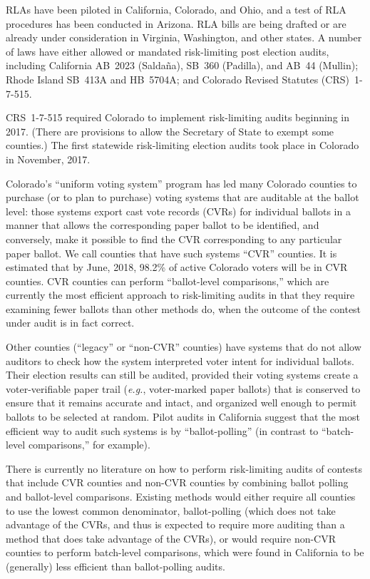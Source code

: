 \documentclass[12pt]{article}
\begin{document}
RLAs have been piloted in California, Colorado, and Ohio, and a test of
RLA procedures has been conducted in Arizona.
RLA bills are being drafted or are already under consideration in Virginia, Washington, and other states.
A number of laws have either allowed or mandated risk-limiting post election audits,
including California AB~2023 (Salda\~{n}a), SB~360 (Padilla), and AB~44 (Mullin);
Rhode Island SB~413A and HB~5704A; and Colorado Revised Statutes (CRS)~1-7-515.

CRS~1-7-515 required 
Colorado to implement risk-limiting audits beginning in 2017.
(There are provisions to allow the Secretary of State to exempt some counties.)
The first statewide risk-limiting election audits took place in Colorado in November, 2017. 

Colorado's ``uniform voting system'' program has led
many Colorado counties to purchase (or to plan to purchase) voting systems
that are auditable at the ballot level: those systems export cast vote records (CVRs)
for individual ballots in a manner that allows the corresponding paper ballot to be identified,
and conversely, make it possible to find the CVR corresponding to any
particular paper ballot.
We call counties that have such systems ``CVR'' counties.
It is estimated that by June, 2018, 98.2\% of active Colorado voters will be in CVR counties.
CVR counties can perform ``ballot-level comparisons,'' which are currently the
most efficient approach to risk-limiting audits in that they require examining
fewer ballots than other methods do, when the outcome of the contest under audit 
is in fact correct.

Other counties (``legacy'' or ``non-CVR'' counties) 
have systems that do not allow auditors to check how the system
interpreted voter intent for individual ballots.
Their election results can still be audited, provided their voting systems
create a voter-verifiable paper trail (\emph{e.g.}, voter-marked paper ballots) that is
conserved to ensure that it remains accurate and intact, and organized well enough
to permit ballots to be selected at random.
Pilot audits in California suggest that the most efficient way to audit such systems
is by ``ballot-polling''  
(in contrast to ``batch-level comparisons,'' for example).

There is currently no literature on how to perform risk-limiting audits 
of contests that include CVR counties and non-CVR counties by combining
ballot polling and ballot-level comparisons.
Existing methods would either require all counties to use the lowest
common denominator, ballot-polling (which does not take advantage of the CVRs,
and thus is expected to require more auditing than a method that does take
advantage of the CVRs), or would
require non-CVR counties to perform batch-level comparisons, which were found in
California to be (generally) less efficient than ballot-polling audits.
\end{document}

